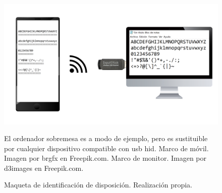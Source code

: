 \begin{itemize}
\begin{figure}[H]
    \centering
    \includegraphics[width=\textwidth]{gfx/diagrama_texto.png}
    \caption{Maqueta de identificación de disposición. Realización propia.}
    \label{fig:diagrama_texto}
    El ordenador sobremesa es a modo de ejemplo, pero es sustituible por cualquier dispositivo compatible con \gls{usb} \gls{hid}.\newline
    Marco de móvil. Imagen por brgfx en Freepik.com.\newline
    Marco de monitor. Imagen por d3images en Freepik.com.\newline
\end{figure}

\end{itemize}